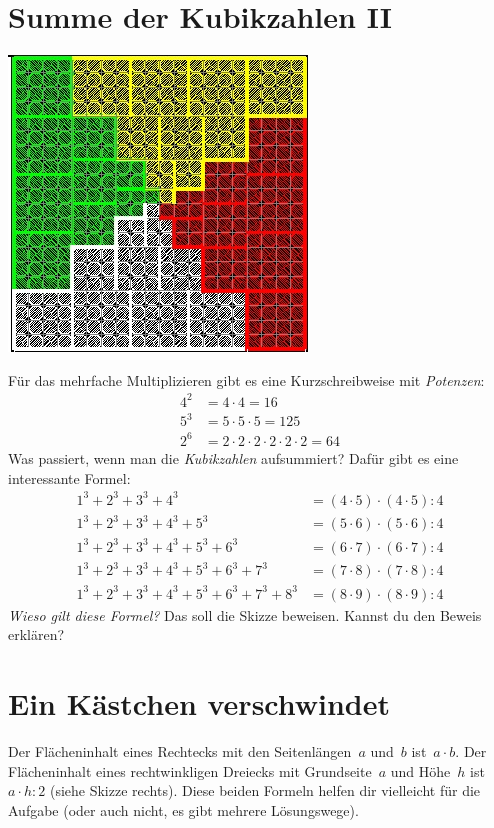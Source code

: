 \documentclass[a5paper,ngerman,landscape,11pt]{scrartcl}
\begin{document}
\section*{Summe der Kubikzahlen II}
\begin{floatingfigure}[r]{5cm}
  \vspace{1cm}
  \includegraphics[scale=0.6]{kubikzahlen-2}
\end{floatingfigure}
Für das mehrfache Multiplizieren gibt es eine Kurzschreibweise mit \emph{Potenzen}:
\begin{align*}
  4^2 &= 4 \cdot 4 = 16 \\
  5^3 &= 5 \cdot 5 \cdot 5 = 125 \\
  2^6 &= 2 \cdot 2 \cdot 2 \cdot 2 \cdot 2 \cdot 2 = 64
\end{align*}
Was passiert, wenn man die \emph{Kubikzahlen} aufsummiert? Dafür gibt es
eine interessante Formel:
\begin{align*}
  1^3 + 2^3 + 3^3 + 4^3 \phantom{{} + 5^3 + 6^3 + 7^3 + 8^3} &= (4 \cdot 5) \cdot (4 \cdot 5) : 4 \\
  1^3 + 2^3 + 3^3 + 4^3 + 5^3 \phantom{{} + 6^3 + 7^3 + 8^3} &= (5 \cdot 6) \cdot (5 \cdot 6) : 4 \\
  1^3 + 2^3 + 3^3 + 4^3 + 5^3 + 6^3 \phantom{{} + 7^3 + 8^3} &= (6 \cdot 7) \cdot (6 \cdot 7) : 4 \\
  1^3 + 2^3 + 3^3 + 4^3 + 5^3 + 6^3 + 7^3 \phantom{{} + 8^3} &= (7 \cdot 8) \cdot (7 \cdot 8) : 4 \\
  1^3 + 2^3 + 3^3 + 4^3 + 5^3 + 6^3 + 7^3 + 8^3 &= (8 \cdot 9) \cdot (8 \cdot 9) : 4
\end{align*}
\emph{Wieso gilt diese Formel?} Das soll die Skizze beweisen. Kannst du den
Beweis erklären?


\newpage
\section*{Ein Kästchen verschwindet}
\begin{floatingfigure}[r]{3.5cm}
  \vspace{-0.3cm}
  \scalebox{0.4}{}
\end{floatingfigure}
Der Flächeninhalt eines Rechtecks mit den Seitenlängen~$a$ und~$b$ ist~$a \cdot
b$. Der Flächeninhalt eines rechtwinkligen Dreiecks mit Grundseite~$a$ und
Höhe~$h$ ist~$a \cdot h : 2$ (siehe Skizze rechts). Diese beiden Formeln helfen
dir vielleicht für die Aufgabe (oder auch nicht, es gibt mehrere Lösungswege).
\end{document}
